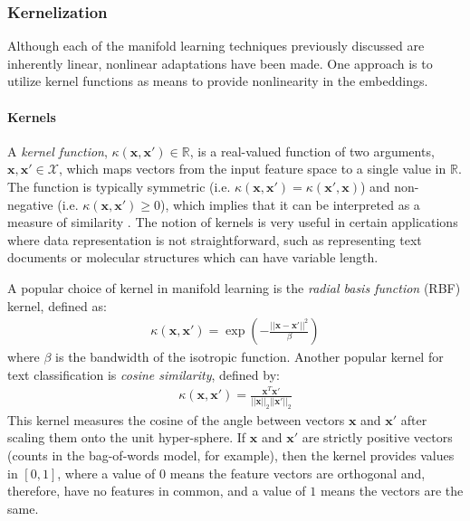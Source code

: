 \subsubsection{Kernelization} \label{sec:Kernels}
Although each of the manifold learning techniques previously discussed are inherently linear, nonlinear adaptations have been made.  One approach is to utilize kernel functions as means to provide nonlinearity in the embeddings. 

\paragraph{Kernels} A \textit{kernel function}, $\kappa(\bm{x},\bm{x}') \in \mathbb{R}$, is a real-valued function of two arguments, $\bm{x},\bm{x}' \in \mathcal{X}$, which maps vectors from the input feature space to a single value in $\mathbb{R}$.  The function is typically symmetric (i.e.  $\kappa(\bm{x},\bm{x}') =  \kappa(\bm{x}',\bm{x})$) and non-negative (i.e.  $\kappa(\bm{x},\bm{x}') \geq 0$), which implies that it can be interpreted as a measure of similarity \citep{Murphy2012}.  The notion of kernels is very useful in certain applications where data representation is not straightforward, such as representing text documents or molecular structures which can have variable length.  

A popular choice of kernel in manifold learning is the \textit{radial basis function} (RBF) kernel, defined as:
\begin{align}
	\kappa(\bm{x},\bm{x}') = \exp \left( - \frac{|| \bm{x} - \bm{x}' ||^{2}}{\beta} \right)
\end{align}
\noindent
where $\beta$ is the bandwidth of the isotropic function.  Another popular kernel for text classification is \textit{cosine similarity}, defined by:
\begin{align}
	\kappa(\bm{x},\bm{x}') = \frac{\bm{x}^{T}\bm{x}'}{||\bm{x}||_{2}||\bm{x}'||_{2}} 
\end{align}
\noindent
This kernel measures the cosine of the angle between vectors $\bm{x}$ and  $\bm{x}'$ after scaling them onto the unit hyper-sphere.  If  $\bm{x}$ and  $\bm{x}'$ are strictly positive vectors (counts in the bag-of-words model, for example), then the kernel provides values in $[0,1]$, where a value of $0$ means the feature vectors are orthogonal and, therefore, have no features in common, and a value of $1$ means the vectors are the same. 

